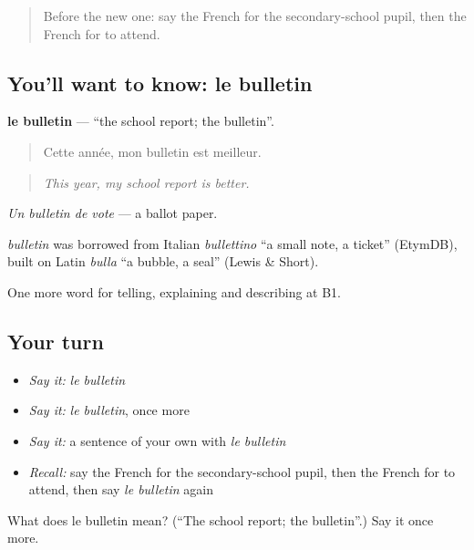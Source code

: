 \begin{quote}
Before the new one: say the French for the secondary-school pupil, then the French for to attend.
\end{quote}

\subsection*{You'll want to know: le bulletin}
\textbf{le bulletin} — \textquotedblleft{}the school report; the bulletin\textquotedblright{}.

\begin{quote}
Cette année, mon bulletin est meilleur.
\end{quote}

\begin{quote}
\emph{This year, my school report is better.}
\end{quote}

\emph{Un bulletin de vote} — a ballot paper.

\begin{cousinweb}
\emph{bulletin} was borrowed from Italian \emph{bullettino} \textquotedblleft{}a small note, a ticket\textquotedblright{} (EtymDB), built on Latin \emph{bulla} \textquotedblleft{}a bubble, a seal\textquotedblright{} (Lewis \& Short).
\end{cousinweb}

\begin{grammarlens}[title={What you've built}]
One more word for telling, explaining and describing at B1.
\end{grammarlens}

\subsection*{Your turn}
\begin{itemize}
\raggedright
  \item \emph{Say it:} \emph{le bulletin}
  \item \emph{Say it:} \emph{le bulletin}, once more
  \item \emph{Say it:} a sentence of your own with \emph{le bulletin}
  \item \emph{Recall:} say the French for the secondary-school pupil, then the French for to attend, then say \emph{le bulletin} again
\end{itemize}

\begin{tcolorbox}[breakable,colback=teal!4,colframe=teal!35!black,title={Before you move on}]
What does le bulletin mean? (\textquotedblleft{}The school report; the bulletin\textquotedblright{}.) Say it once more.
\end{tcolorbox}
